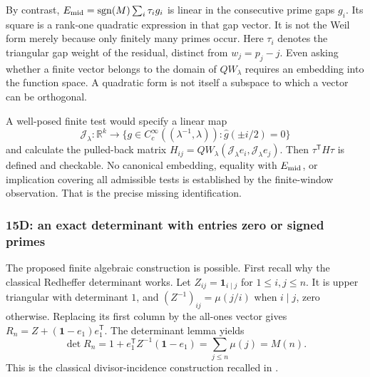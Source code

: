 \documentclass[11pt]{amsart}
\numberwithin{equation}{section}
\theoremstyle{plain}
\theoremstyle{definition}
\theoremstyle{remark}
\begin{document}
By contrast, $E_{\rm mid}=\operatorname{sgn}(M)\sum_i \tau_i g_i$ is
linear in the consecutive prime gaps $g_i$. Its square is a rank-one
quadratic expression in that gap vector. It is not the Weil form merely
because only finitely many primes occur. Here $\tau_i$ denotes the triangular
gap weight of the residual, distinct from $w_j=p_j-j$.
Even asking whether a finite vector belongs to the domain of
$QW_\lambda$ requires an embedding into the function space.
A quadratic form is not itself a subspace to which a vector can be
orthogonal.

A well-posed finite test would specify a linear map
\begin{equation}
\label{eq:a12-Weil-embedding}
\mathcal J_\lambda:\mathbb R^k\longrightarrow
\{g\in C_c^\infty((\lambda^{-1},\lambda)):
\widehat g(\pm i/2)=0\}
\end{equation}
and calculate the pulled-back matrix
$H_{ij}=QW_\lambda(\mathcal J_\lambda e_i,\mathcal J_\lambda e_j)$.
Then $\tau^\mathsf{T}H\tau$ is defined and checkable.
No canonical embedding, equality with $E_{\rm mid}$, or implication
covering all admissible tests is established by the finite-window
observation. That is the precise missing identification.

\subsubsection{15D: an exact determinant with entries zero or signed primes}
\label{subsubsec:a12-determinant}
The proposed finite algebraic construction is possible.
First recall why the classical Redheffer determinant works. Let
$Z_{ij}=\mathbf1_{i\mid j}$ for $1\le i,j\le n$.
It is upper triangular with determinant $1$, and
$(Z^{-1})_{ij}=\mu(j/i)$ when $i\mid j$, zero otherwise.
Replacing its first column by the all-ones vector gives
$R_n=Z+(\mathbf1-e_1)e_1^\mathsf{T}$. The determinant lemma yields
\begin{equation}
\label{eq:a12-Redheffer}
\det R_n=1+e_1^\mathsf{T}Z^{-1}(\mathbf1-e_1)
=\sum_{j\le n}\mu(j)=M(n).
\end{equation}
This is the classical divisor-incidence construction recalled in
\cite{Connes2026}.
\end{document}
